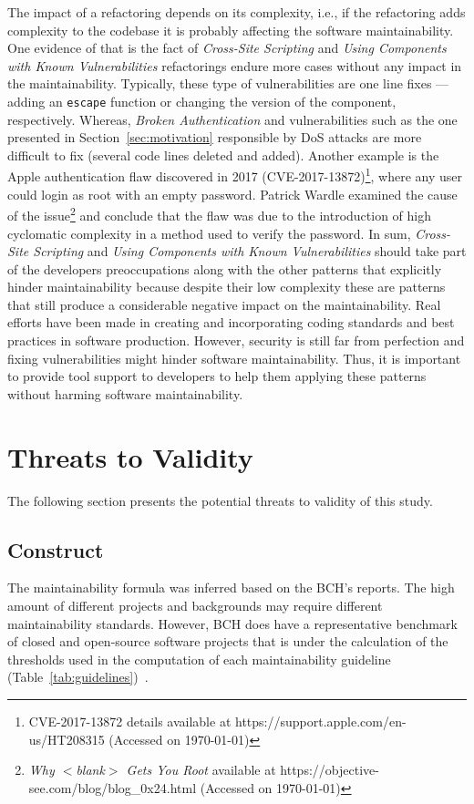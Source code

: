 \documentclass[10pt,conference]{IEEEtran}
\begin{document}
{The impact of a refactoring depends on its complexity, i.e., if the refactoring
adds complexity to the codebase it is probably affecting the software
maintainability. One evidence of that is the fact of \emph{Cross-Site
Scripting} and \emph{Using Components with Known Vulnerabilities} refactorings
endure more cases without any impact in the maintainability. Typically, these
type of vulnerabilities are one line fixes --- adding an \texttt{escape}
function or changing the version of the component, respectively. Whereas,
\emph{Broken Authentication} and vulnerabilities such as the one presented in
Section~\ref{sec:motivation} responsible by DoS attacks are more difficult to
fix (several code lines deleted and added). Another example is the Apple
authentication flaw discovered in 2017 (CVE-2017-13872)\footnote{CVE-2017-13872
details available at https://support.apple.com/en-us/HT208315 (Accessed on
\today{})}, where any user could login as root with an empty password. Patrick
Wardle examined the cause of the issue\footnote{\emph{Why $<$blank$>$ Gets You
Root} available at https://objective-see.com/blog/blog\_0x24.html (Accessed on
\today{})} and conclude that the flaw was due to the introduction of high
cyclomatic complexity in a method used to verify the password. In sum,
\emph{Cross-Site Scripting} and \emph{Using Components with Known
Vulnerabilities} should take part of the developers preoccupations along with
the other patterns that explicitly hinder maintainability because despite their
low complexity these are patterns that still produce a considerable negative
impact on the maintainability. Real efforts have been made in creating and
incorporating coding standards and best practices in software production.
However, security is still far from perfection and fixing vulnerabilities might
hinder software maintainability. Thus, it is important to provide tool support
to developers to help them applying these patterns without harming software
maintainability.

\section{Threats to Validity}\label{sec:threats}
%
The following section presents the potential threats to validity of this study.
%
\subsection{Construct}
%

The maintainability formula was inferred based on the BCH's reports.
The high amount of different projects and backgrounds may require different maintainability
standards. However, BCH does have a representative benchmark of closed and open-source
software projects that is under the calculation of the thresholds used in the computation
of each maintainability guideline (Table~\ref{tab:guidelines})~\cite{Visser:2016:OREILLY,
Baggen2012}.

}
\end{document}
